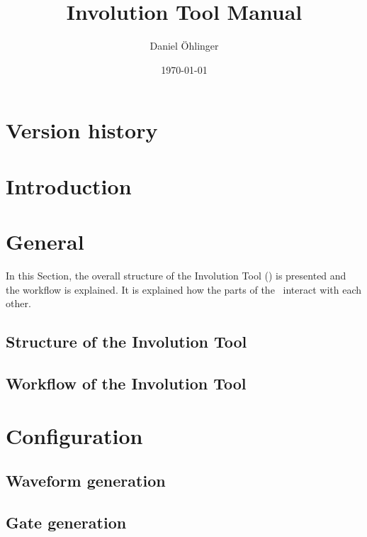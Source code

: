 \documentclass[a4,12pt,hidelinks]{article}
\begin{document}
\title{Involution Tool Manual}
\author{Daniel \"Ohlinger}
\date{\today}
\maketitle

\tableofcontents 

\section*{Version history}
\label{sec:man-version-history}


\section{Introduction}
\label{sec:man-introduction}


\section{General}
In this Section, the overall structure of the Involution Tool (\invt) is 
presented and the workflow is explained. It is explained how the parts of the 
\invt\ interact with each other.

\label{sec:man-general}
\subsection{Structure of the Involution Tool}
\label{sec:man-general-structure}


\subsection{Workflow of the Involution Tool}
\label{sec:man-general-workflow}


\section{Configuration}
\label{sec:man-configuration}

\subsection{Waveform generation}
\label{sec:man-configuration-waveform}


\subsection{Gate generation}
\label{sec:man-configuration-gate}

\end{document}
